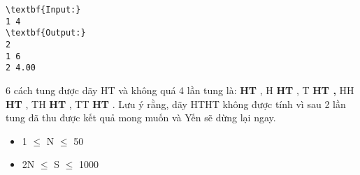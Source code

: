 \begin{verbatim}
\textbf{Input:}
1 4
\textbf{Output:}
2
1 6
2 4.00\end{verbatim}
6 cách tung được dãy HT và không quá 4 lần tung là: \textbf{HT} , H \textbf{HT} , T \textbf{ HT , } HH \textbf{HT} , TH \textbf{HT} , TT \textbf{ HT} . Lưu ý rằng, dãy HTHT không được tính vì sau 2 lần tung đã thu được kết quả mong muốn và Yến sẽ dừng lại ngay.
\begin{itemize}
	\item 1  $\le$  N  $\le$  50
	\item 2N  $\le$  S  $\le$  1000
\end{itemize}